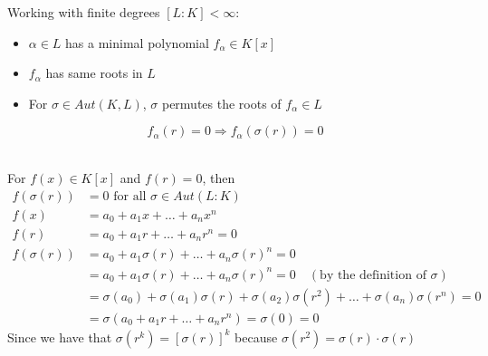 \documentclass{article}
\begin{document}
\hrulefill

Working with finite degrees $[L:K] < \infty$:
\begin{itemize}
    \item $\alpha \in L$ has a minimal polynomial $f_\alpha \in K[x]$
    \item $f_\alpha$ has same roots in $L$
    \item For $\sigma \in Aut(K,L)$, $\sigma$ permutes the roots of $f_\alpha \in L$
\end{itemize}
$$f_\alpha(r) = 0 \Rightarrow f_\alpha(\sigma(r)) = 0$$

\hrulefill \\ 
For $f(x) \in K[x]$ and $f(r) = 0$, then
\begin{align*}
    f(\sigma(r)) &= 0 \text{ for all } \sigma \in Aut(L:K) \\
    f(x) &= a_0 + a_1 x + \dots + a_n x^n \\
    f(r) &= a_0 + a_1 r + \dots + a_n r^n = 0 \\
    f(\sigma(r)) &= a_0 + a_1 \sigma(r) + \dots + a_n \sigma(r)^n = 0 \\
    &= a_0 + a_1 \sigma(r) + \dots + a_n \sigma(r)^n = 0 \quad (\text{by the definition of } \sigma)\\
    &= \sigma(a_0) + \sigma(a_1) \sigma(r) + \sigma(a_2) \sigma(r^2)+ \dots + \sigma(a_n) \sigma(r^n) = 0 \\
    &= \sigma(a_0 + a_1 r + \dots + a_n r^n) = \sigma(0) = 0
\end{align*}
Since we have that $\sigma(r^k) = [\sigma(r)]^k$ because $\sigma(r^2) = \sigma(r) \cdot \sigma(r)$ 
\end{document}
